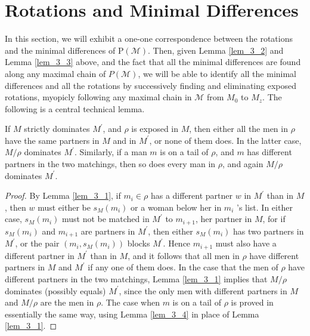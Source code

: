 \section{Rotations and Minimal Differences}

In this section, we will exhibit a one-one correspondence between the rotations and the minimal differences of $\mathrm{P}(\mathcal{M})$. Then, given Lemma \ref{lem_3_2} and Lemma \ref{lem_3_3} above, and the fact that all the minimal differences are found along any maximal chain of $P(\mathcal{M})$, we will be able to identify all the minimal differences and all the rotations by successively finding and eliminating exposed rotations, myopicly following any maximal chain in $\mathcal{M}$ from $M_0$ to $M_z$. The following is a central technical lemma.

\begin{lemma}\label{lem_3_5}
If $M$ strictly dominates $M^{\prime}$, and $\rho$ is exposed in $M$, then either all the men in $\rho$ have the same partners in $M$ and in $M^{\prime}$, or none of them does. In the latter case, $M / \rho$ dominates $M^{\prime}$. Similarly, if a man $m$ is on a tail of $\rho$, and $m$ has different partners in the two matchings, then so does every man in $\rho$, and again $M / \rho$ dominates $M^{\prime}$.
\end{lemma}

\begin{proof}
By Lemma \ref{lem_3_1}, if $m_i \in \rho$ has a different partner $w$ in $M^{\prime}$ than in $M$, then $w$ must either be $s_M\left(m_i\right)$ or a woman below her in $m_i$ 's list. In either case, $s_M\left(m_i\right)$ must not be matched in $M^{\prime}$ to $m_{i+1}$, her partner in $M$, for if $s_M\left(m_i\right)$ and $m_{i+1}$ are partners in $M^{\prime}$, then either $s_M\left(m_i\right)$ has two partners in $M^{\prime}$, or the pair $\left(m_i,s_M\left(m_i\right)\right)$ blocks $M^{\prime}$. Hence $m_{i+1}$ must also have a different partner in $M^{\prime}$ than in $M$, and it follows that all men in $\rho$ have different partners in $M$ and $M^{\prime}$ if any one of them does. In the case that the men of $\rho$ have different partners in the two matchings, Lemma \ref{lem_3_1} implies that $M / \rho$ dominates (possibly equals) $M^{\prime}$, since the only men with different partners in $M$ and $M / \rho$ are the men in $\rho$. The case when $m$ is on a tail of $\rho$ is proved in essentially the same way, using Lemma \ref{lem_3_4} in place of Lemma \ref{lem_3_1}.
\end{proof}

